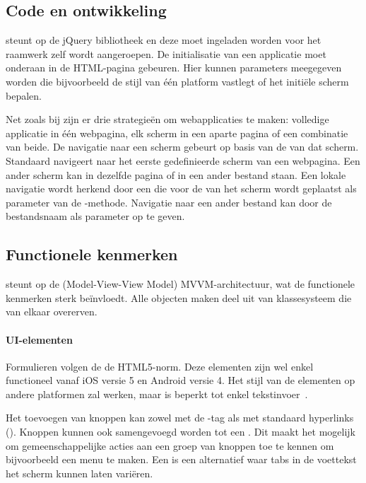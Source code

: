 \subsection{Code en ontwikkeling}
\kendo{} steunt op de jQuery bibliotheek en deze moet ingeladen worden voor het \kendo{} raamwerk zelf wordt aangeroepen.
De initialisatie van een applicatie moet onderaan in de HTML-pagina gebeuren.	
Hier kunnen parameters meegegeven worden die bijvoorbeeld de stijl van één platform vastlegt of het initiële scherm bepalen.

Net zoals bij \jqm{} zijn er drie strategieën om webapplicaties te maken:  volledige applicatie in één webpagina,  elk scherm in een aparte pagina of een combinatie van beide.
De navigatie naar een scherm gebeurt op basis van de  van dat scherm.
Standaard navigeert \kendo{} naar het eerste gedefinieerde scherm van een webpagina.
Een ander scherm kan in dezelfde pagina of in een ander bestand staan.
Een lokale navigatie wordt herkend door een  die voor de  van het scherm wordt geplaatst als parameter van de -methode.
Navigatie naar een ander bestand kan door de bestandsnaam als parameter op te geven.

\subsection{Functionele kenmerken}
\label{sec:kendo-functioneel}
\kendo{} steunt op de (Model-View-View Model) MVVM-architectuur,  wat de functionele kenmerken sterk beïnvloedt.
Alle objecten maken deel uit van klassesysteem die van elkaar overerven.

\paragraph{UI-elementen}
Formulieren volgen de de HTML5-norm. 
Deze elementen zijn wel enkel functioneel vanaf iOS versie 5 en Android versie 4.  
Het stijl van de elementen op andere platformen zal werken, maar is beperkt tot enkel tekstinvoer~\cite{Telerike}.

Het toevoegen van knoppen kan zowel met de -tag als met standaard hyperlinks ().
Knoppen kunnen ook samengevoegd worden tot een .
Dit maakt het mogelijk om gemeenschappelijke acties aan een groep van knoppen toe te kennen om bijvoorbeeld een menu te maken.
Een  is een alternatief waar tabs in de voettekst het scherm kunnen laten variëren.

